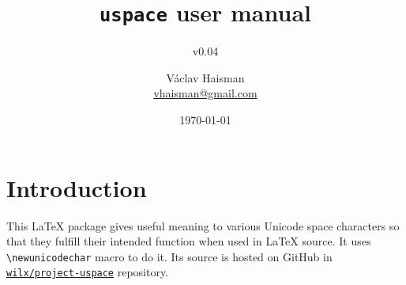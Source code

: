 \documentclass[paper=B5,DIV=calc,parskip=half]{scrartcl}
\author{Václav Haisman\texorpdfstring{%
    \\{\small\href{mailto:vhaisman+uspace@gmail.com?subject=[uspace]}{vhaisman@gmail.com}}}{}}
\date{\today}
\title{\texttt{uspace} user manual}
\subtitle{v0.04}
\begin{document}
\begin{titlepage}
  \maketitle
\end{titlepage}

\tableofcontents

\section{Introduction}%
%
This \LaTeX{} package gives useful meaning to various Unicode space
characters so that they fulfill their intended function when used in \LaTeX{}
source. It uses \lstinline|\newunicodechar| macro to do it. Its source is
hosted on GitHub in
\texttt{\href{https://github.com/wilx/project-uspace}{wilx/project-uspace}}
repository.
\end{document}
